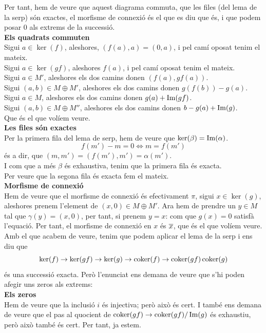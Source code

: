 \documentclass[11pt, a4paper]{article}
\begin{document}
Per tant, hem de veure que aquest diagrama commuta, que les files (del lema de la serp) són exactes, el morfisme de connexió és el que es diu que és, i que podem posar 0 als extrems de la successió.\\[4mm]
\textbf{Els quadrats commuten}\\
Sigui $a\in \ker(f)$, aleshores, $(f(a),a)=(0,a)$, i pel camí oposat tenim el mateix.\\
Sigui $a\in \ker(gf)$, aleshores $f(a)$, i pel camí oposat tenim el mateix.\\
Sigui $a\in M'$, aleshores els dos camins donen $(f(a),gf(a))$.\\
Sigui $(a,b)\in M\oplus M'$, aleshores els dos camins donen $g(f(b))-g(a)$.\\
Sigui $a\in M$, aleshores els dos camins donen $g(a)+\operatorname{Im}(gf)$.\\
Sigui $(a,b)\in M\oplus M''$, aleshores els dos camins donen $b-g(a)+\operatorname{Im}(g)$.\\
Que és el que volíem veure.\\[4mm]
\textbf{Les files són exactes}\\
Per la primera fila del lema de serp, hem de veure que $\ker(\beta) = \operatorname{Im}(\alpha)$. 
\[
f(m')-m = 0 \iff m = f(m')
\]
és a dir, que $(m,m') = (f(m'),m')=\alpha(m')$.\\
I com que a més $\beta$ és exhaustiva, tenim que la primera fila és exacta.\\[3mm]
Per veure que la segona fila és exacta fem el mateix.\\[4mm]
\textbf{Morfisme de connexió}\\
Hem de veure que el morfisme de connexió és efectivament $\pi$, sigui $x\in \ker(g)$, aleshores prenem l'element de $(x,0)\in M\oplus M'$. Ara hem de prendre un $y\in M$ tal que $\gamma(y)=(x,0)$, per tant, si prenem $y=x$: com que $g(x)=0$ satisfà l'equació. Per tant, el morfisme de connexió en $x$ és $\overline{x}$, que és el que volíem veure.\\[4mm]
Amb el que acabem de veure, tenim que podem aplicar el lema de la serp i ens diu que
\[
    \ker(f)\to \ker(gf)\to\ker(g)\to\operatorname*{coker}(f)\to\operatorname*{coker}(gf)\operatorname*{coker}(g)
\]
és una successió exacta. Però l'enunciat ens demana de veure que s'hi poden afegir uns zeros als extrems:\\[2mm]
\textbf{Els zeros}\\
Hem de veure que la inclusió $i$ és injectiva; però això és cert. I també ens demana de veure que el pas al quocient de $\operatorname*{coker}(gf)\to \operatorname*{coker}(gf)/\operatorname{Im}(g)$ és exhaustiu, però això també és cert. Per tant, ja estem.
\end{document}
